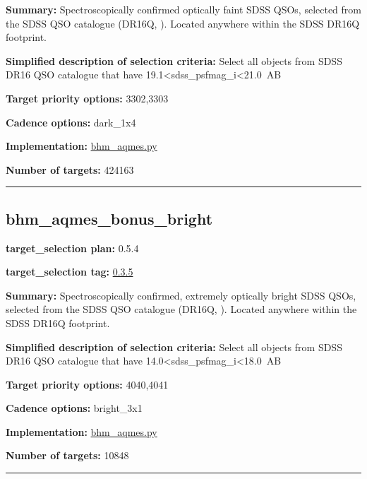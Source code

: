\noindent\textbf{Summary:} Spectroscopically confirmed optically faint SDSS QSOs,
selected from the SDSS QSO catalogue (DR16Q,
\citealt{Lyke2020}). Located anywhere within the SDSS DR16Q footprint.

\noindent\textbf{Simplified description of selection criteria:} Select all
objects from SDSS DR16 QSO catalogue that have
19.1\textless sdss\_psfmag\_i\textless21.0~AB


\noindent\textbf{Target priority options:} 3302,3303

\noindent\textbf{Cadence options:} dark\_1x4

\noindent\textbf{Implementation:}
\href{https://github.com/sdss/target_selection/blob/0.3.5/python/target_selection/cartons/bhm_aqmes.py}{bhm\_aqmes.py}

\noindent\textbf{Number of targets:} 424163

\begin{center}\rule{0.5\linewidth}{0.5pt}\end{center}

\hypertarget{bhm_aqmes_bonus_bright_plan0.5.4}{%
\subsection{bhm\_aqmes\_bonus\_bright}\label{bhm_aqmes_bonus_bright_plan0.5.4}}

\noindent\textbf{target\_selection plan:} 0.5.4

\noindent\textbf{target\_selection tag:}
\href{https://github.com/sdss/target_selection/tree/0.3.5/}{0.3.5}

\noindent\textbf{Summary:} Spectroscopically confirmed, extremely optically
bright SDSS QSOs, selected from the SDSS QSO catalogue (DR16Q,
\citealt{Lyke2020}). Located anywhere within the SDSS DR16Q footprint.

\noindent\textbf{Simplified description of selection criteria:} Select all
objects from SDSS DR16 QSO catalogue that have
14.0\textless sdss\_psfmag\_i\textless18.0~AB


\noindent\textbf{Target priority options:} 4040,4041

\noindent\textbf{Cadence options:} bright\_3x1

\noindent\textbf{Implementation:}
\href{https://github.com/sdss/target_selection/blob/0.3.5/python/target_selection/cartons/bhm_aqmes.py}{bhm\_aqmes.py}

\noindent\textbf{Number of targets:} 10848

\begin{center}\rule{0.5\linewidth}{0.5pt}\end{center}

